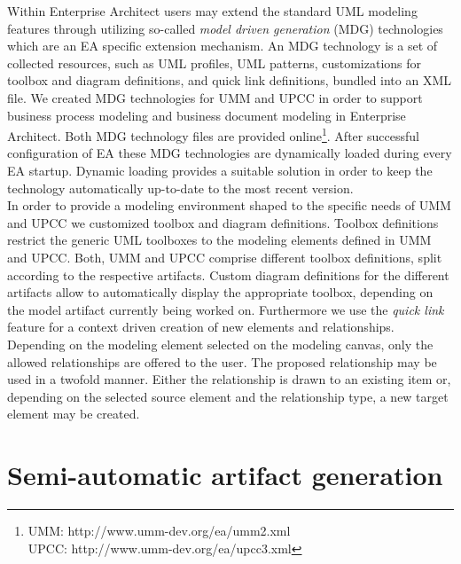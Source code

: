 \documentclass{acm_proc_article-sp}
\begin{document}
Within Enterprise Architect users may extend the standard UML modeling features through utilizing so-called \textit{model driven generation} (MDG) technologies which are an EA specific extension mechanism. An MDG technology is a set of collected resources, such as UML profiles, UML patterns, customizations for toolbox and diagram definitions, and quick link definitions, bundled into an XML file. We created MDG technologies for UMM and UPCC in order to support business process modeling and business document modeling in Enterprise Architect. Both MDG technology files are provided online\footnote{UMM: http://www.umm-dev.org/ea/umm2.xml\\UPCC:\; http://www.umm-dev.org/ea/upcc3.xml}. After successful configuration of EA these MDG technologies are dynamically loaded during every EA startup. Dynamic loading provides a suitable solution in order to keep the technology automatically up-to-date to the most recent version. \\
In order to provide a modeling environment shaped to the specific needs of UMM and UPCC we customized toolbox and diagram definitions. Toolbox definitions restrict the generic UML toolboxes to the modeling elements defined in UMM and UPCC. Both, UMM and UPCC comprise different toolbox definitions, split according to the respective artifacts. Custom diagram definitions for the different artifacts allow to automatically display the appropriate toolbox, depending on the model artifact currently being worked on.
Furthermore we use the \textit{quick link} feature for a context driven creation of new elements and relationships. Depending on the modeling element selected on the modeling canvas, only the allowed relationships are offered to the user. The proposed relationship may be used in a twofold manner. Either the relationship is drawn to an existing item or, depending on the selected source element and the relationship type, a new target element may be created.

\section{Semi-automatic artifact generation}
\end{document}
